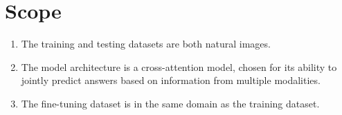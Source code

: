 \section{Scope}
\begin{enumerate}
    \item The training and testing datasets are both natural images.
    \item The model architecture is a cross-attention model, chosen for its ability to jointly predict answers based on information from multiple modalities.
    \item The fine-tuning dataset is in the same domain as the training dataset.
\end{enumerate}


